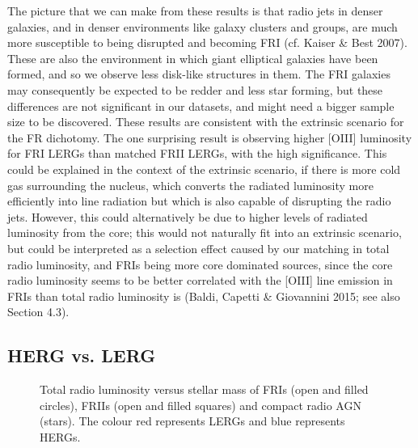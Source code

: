 \documentclass[usenatbib]{mn2e}
\begin{document}
The picture that we can make from these results is that radio jets in
denser galaxies, and in denser environments like galaxy clusters and
groups, are much more susceptible to being disrupted and becoming FRI
(cf. Kaiser \& Best 2007). These are also the environment in which giant
elliptical galaxies have been formed, and so we observe less disk-like
structures in them. The FRI galaxies may consequently be expected to be
redder and less star forming, but these differences are not significant in
our datasets, and might need a bigger sample size to be discovered. These
results are consistent with the extrinsic scenario for the FR
dichotomy. The one surprising result is observing higher [OIII] luminosity
for FRI LERGs than matched FRII LERGs, with the high significance. This could
be explained in the context of the extrinsic scenario, if there is more cold gas surrounding
 the nucleus, which converts the radiated luminosity more efficiently into line radiation
  but which is also capable of disrupting the radio jets. However, this could alternatively 
  be due to higher levels of radiated luminosity from the core; this would not naturally fit
   into an extrinsic scenario, but could be interpreted as a selection effect caused by our 
   matching in total radio luminosity, and
FRIs being more core dominated sources, since the core radio luminosity
seems to be better correlated with the [OIII] line emission in FRIs than
total radio luminosity is (Baldi, Capetti \& Giovannini 2015; see also Section 4.3).

 

\subsection {HERG vs. LERG } 

\begin{figure}
\center
{}


\caption{Total radio luminosity versus stellar mass of FRIs (open and filled circles), 
FRIIs (open and filled squares) and compact radio AGN (stars). The colour red represents 
LERGs and blue represents HERGs.}
\label{HL}
\end{figure}
\end{document}
